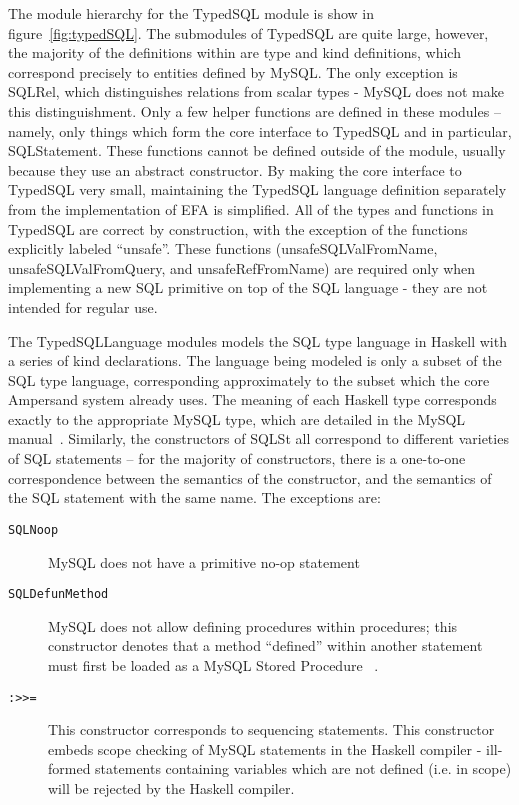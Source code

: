 \documentclass[12pt, svgnames]{article}
\begin{document}
The module hierarchy for the TypedSQL module is show in
figure~\ref{fig:typedSQL}. The submodules of TypedSQL are quite large, however,
the majority of the definitions within are type and kind definitions, which correspond 
precisely to entities defined by MySQL. The only exception is SQLRel, which distinguishes
relations from scalar types - MySQL does not make this distinguishment. Only a few
helper functions are defined in these modules -- namely, only things which form
the core interface to TypedSQL and in particular, SQLStatement. These functions
cannot be defined outside of the module, usually because they use an abstract
constructor. By making the core interface to TypedSQL very small, maintaining 
the TypedSQL language definition separately from the implementation of 
EFA is simplified. All of the types and functions in TypedSQL are correct by 
construction, with the exception of the functions explicitly labeled ``unsafe''.
These functions (unsafeSQLValFromName, unsafeSQLValFromQuery, and unsafeRefFromName)
are required only when implementing a new SQL primitive on top of the SQL
language - they are not intended for regular use. 

The TypedSQLLanguage modules models the SQL type language in Haskell with a
series of kind declarations. The language being modeled is only a subset of the
SQL type language, corresponding approximately to the subset which the core
Ampersand system already uses. The meaning of each Haskell type corresponds
exactly to the appropriate MySQL type, which are detailed in the MySQL
manual~\cite{mySQLman}. Similarly, the constructors of SQLSt all correspond
to different varieties of SQL statements -- for the majority of constructors,
there is a one-to-one correspondence between the semantics of the constructor,
and the semantics of the SQL statement with the same name. The exceptions 
are: 

\begin{description}
\item[\texttt{SQLNoop}] MySQL does not have a primitive no-op statement
\item[\texttt{SQLDefunMethod}]  MySQL does not allow defining procedures within procedures; 
  this constructor denotes that a method ``defined'' within another statement must 
  first be loaded as a MySQL Stored Procedure ~\cite{mySQLman}.
\item[\texttt{:>>=}] This constructor corresponds to sequencing statements. This constructor
  embeds scope checking of MySQL statements in the Haskell compiler - ill-formed statements
  containing variables which are not defined (i.e. in scope) will be rejected by the Haskell
  compiler. 
\end{description}
\end{document}
